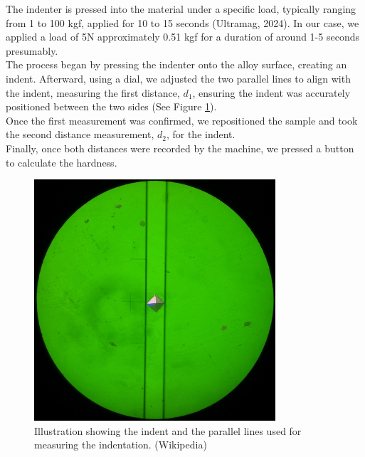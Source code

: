 \documentclass{article}
\begin{document}
\vspace{7pt}
\begin{minipage}{0.55\textwidth}
    The indenter is pressed into the material under a specific load, typically ranging from 1 to 100 kgf, applied for 10 to 15 seconds (Ultramag, 2024). In our case, we applied a load of 5N approximately 0.51 kgf for a duration of around 1-5 seconds presumably.\\[8pt]
    The process began by pressing the indenter onto the alloy surface, creating an indent. Afterward, using a dial, we adjusted the two parallel lines to align with the indent, measuring the first distance, \(d_1\), ensuring the indent was accurately positioned between the two sides (See Figure \ref{fig:vickers}). \\[8pt]  
    Once the first measurement was confirmed, we repositioned the sample and took the second distance measurement, \(d_2\), for the indent.\\[8pt]
    Finally, once both distances were recorded by the machine, we pressed a button to calculate the hardness.
\end{minipage}\hspace{1em}
\begin{minipage}{0.4\textwidth}\centering
\begin{figure}[H]
    \centering
    \includegraphics[width=0.8\textwidth]{images/1024px-Vicker_Hardness_-_Diamond_Indentation.jpg}
    \caption{Illustration showing the indent and the parallel lines used for measuring the indentation. (Wikipedia)}
    \label{fig:vickers}
\end{figure}
\end{minipage}\\
\end{document}
